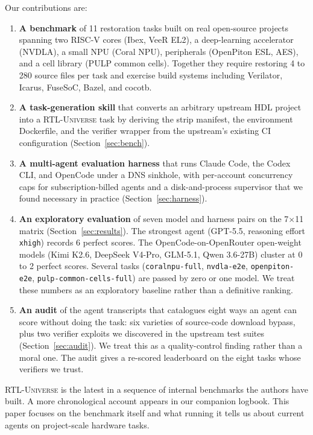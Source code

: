 \documentclass{article}
\begin{document}
Our contributions are:
\begin{enumerate}[nosep, leftmargin=*]
\item \textbf{A benchmark} of 11 restoration tasks built on real open-source projects spanning
two RISC-V cores (Ibex, VeeR EL2), a deep-learning accelerator (NVDLA), a small NPU (Coral
NPU), peripherals (OpenPiton ESL, AES), and a cell library (PULP common cells).
Together they require restoring 4 to 280 source files per task and exercise build systems
including Verilator, Icarus, FuseSoC, Bazel, and cocotb.

\item \textbf{A task-generation skill} that converts an arbitrary upstream HDL project into a
\textsc{RTL-Universe} task by deriving the strip manifest, the environment Dockerfile, and the
verifier wrapper from the upstream's existing CI configuration (Section~\ref{sec:bench}).

\item \textbf{A multi-agent evaluation harness} that runs Claude Code, the Codex CLI, and
OpenCode under a DNS sinkhole, with per-account concurrency caps for subscription-billed
agents and a disk-and-process supervisor that we found necessary in practice
(Section~\ref{sec:harness}).

\item \textbf{An exploratory evaluation} of seven model and harness pairs on the 7$\times$11
matrix (Section~\ref{sec:results}). The strongest agent (GPT-5.5, reasoning effort
\texttt{xhigh}) records 6 perfect scores. The OpenCode-on-OpenRouter open-weight models (Kimi
K2.6, DeepSeek V4-Pro, GLM-5.1, Qwen 3.6-27B) cluster at 0 to 2 perfect scores. Several
tasks (\texttt{coralnpu-full}, \texttt{nvdla-e2e}, \texttt{openpiton-e2e},
\texttt{pulp-common-cells-full}) are passed by zero or one model. We treat these numbers as
an exploratory baseline rather than a definitive ranking.

\item \textbf{An audit} of the agent transcripts that catalogues eight ways an agent can score
without doing the task: six varieties of source-code download bypass, plus two verifier
exploits we discovered in the upstream test suites (Section~\ref{sec:audit}). We treat this as
a quality-control finding rather than a moral one. The audit gives a re-scored leaderboard on
the eight tasks whose verifiers we trust.
\end{enumerate}

\textsc{RTL-Universe} is the latest in a sequence of internal benchmarks the authors have
built. A more chronological account appears in our companion logbook. This paper focuses on
the benchmark itself and what running it tells us about current agents on project-scale
hardware tasks.
\end{document}
